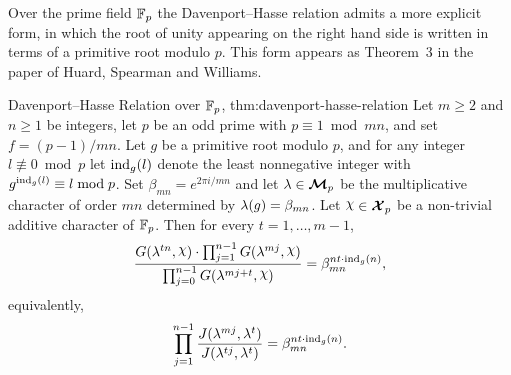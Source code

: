 Over the prime field $\mathbb{F}_p$ the Davenport--Hasse relation admits a more explicit form, in which the root of unity appearing on the right hand side is written in terms of a primitive root modulo $p$. This form appears as Theorem~3 in the paper of Huard, Spearman and Williams.
\begin{Theorem}{Davenport--Hasse Relation over $\mathbb{F}_p$, \cite[Theorem~3]{HuardSpearmanWilliams_1995_AAA}}{thm:davenport-hasse-relation}%
  Let $m\geq 2$ and $n\geq 1$ be integers, let $p$ be an odd prime with $p\equiv 1\bmod{mn}$, and set $f=(p-1)/mn$. Let $g$ be a primitive root modulo $p$, and for any integer $l\not\equiv 0\bmod p$ let $\operatorname{ind}_g(l)$ denote the least nonnegative integer with $g^{\operatorname{ind}_g(l)}\equiv l\bmod p$. Set $\beta_{mn}=e^{2\pi i/mn}$ and let $\lambda\in\boldsymbol{\mathcal{M}}_p$ be the multiplicative character of order $mn$ determined by $\lambda(g)=\beta_{mn}$. Let $\chi\in\Xp$ be a non-trivial additive character of $\mathbb{F}_p$. Then for every $t=1,\dots,m-1$,
  $$\frac{G(\lm^{tn},\chi)\cdot \prod_{j=1}^{n-1}G(\lm^{mj},\chi)}{\prod_{j=0}^{n-1}G(\lm^{mj+t},\chi)}=\beta_{mn}^{nt\cdot \ind_g(n)},$$
  equivalently,
  $$\prod_{j=1}^{n-1}\frac{J(\lambda^{mj},\lambda^t)}{J(\lambda^{tj},\lambda^t)}=\beta_{mn}^{nt\cdot \operatorname{ind}_g(n)}.$$
\end{Theorem}

